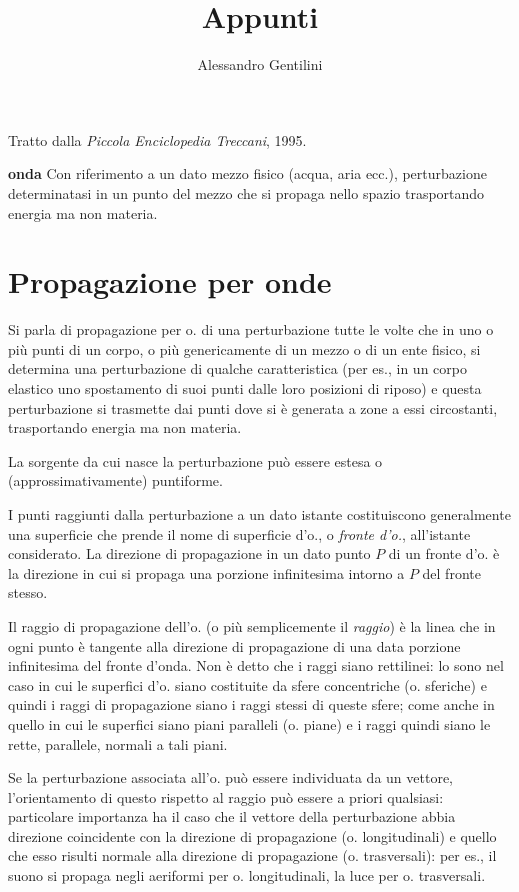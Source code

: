\documentclass[a4paper]{article}
\begin{document}
\title{Appunti}
\author{Alessandro Gentilini}
\maketitle

Tratto dalla \textit{Piccola Enciclopedia Treccani}, 1995.


\textbf{onda} Con riferimento a un dato mezzo fisico (acqua, aria ecc.), perturbazione determinatasi in un punto del mezzo che si propaga nello spazio trasportando energia ma non materia. 

\section{Propagazione per onde}

Si parla di propagazione per o. di una perturbazione tutte le volte che in uno o più punti di un corpo, o più genericamente di un mezzo o di un ente fisico, si determina una perturbazione di qualche caratteristica (per es., in un corpo elastico uno spostamento di suoi punti dalle loro posizioni di riposo) e questa perturbazione si trasmette dai punti dove si è generata a zone a essi circostanti, trasportando energia ma non materia. 

La sorgente da cui nasce la perturbazione può essere estesa o (approssimativamente) puntiforme. 

I punti raggiunti dalla perturbazione a un dato istante costituiscono generalmente una superficie che prende il nome di superficie d'o., o \textit{fronte d'o.}, all'istante considerato. La direzione di propagazione in un dato punto $P$ di un fronte d'o. è la direzione in cui si propaga una porzione infinitesima intorno a $P$ del fronte stesso. 

Il raggio di propagazione dell'o. (o più semplicemente il \textit{raggio}) è la linea che in ogni punto è tangente alla direzione di propagazione di una data porzione infinitesima del fronte d'onda. Non è detto che i raggi siano rettilinei: lo sono nel caso in cui le superfici d'o. siano costituite da sfere concentriche (o. sferiche) e quindi i raggi di propagazione siano i raggi stessi di queste sfere; come anche in quello in cui le superfici siano piani paralleli (o. piane) e i raggi quindi siano le rette, parallele, normali a tali piani. 

Se la perturbazione associata all'o. può essere individuata da un vettore, l'orientamento di questo rispetto al raggio può essere a priori qualsiasi: particolare importanza ha il caso che il vettore della perturbazione abbia direzione coincidente con la direzione di propagazione (o. longitudinali) e quello che esso risulti normale alla direzione di propagazione (o. trasversali): per es., il suono si propaga negli aeriformi per o. longitudinali, la luce per o. trasversali. 
\end{document}
